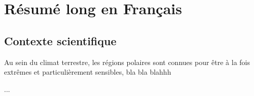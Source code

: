 

\chapter{Résumé long en Français}
\label{chap:resume_francais}


\section*{Contexte scientifique}
Au sein du climat terrestre, les régions polaires sont connues pour être à la fois extrêmes et particulièrement sensibles, bla bla blahhh 

...

